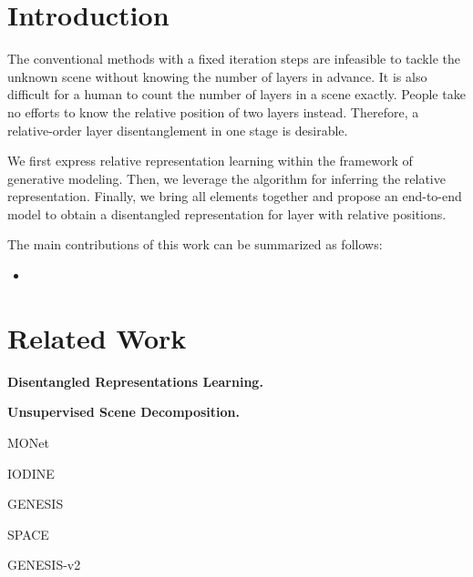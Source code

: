 \section{Introduction}


\noindent \red{[background]}




\noindent {}

The conventional methods with a fixed iteration steps are infeasible to tackle the unknown scene without knowing the number of layers in advance.
It is also difficult for a human to count the number of layers in a scene exactly.
People take no efforts to know the relative position of two layers instead.
Therefore, a relative-order layer disentanglement in one stage is desirable.

\noindent {}

We first express relative representation learning within the framework of generative modeling.
Then, we leverage the algorithm for inferring the relative representation.
Finally, we bring all elements together and propose an end-to-end model to obtain a disentangled representation for layer with relative positions.



\noindent {}





The main contributions of this work can be summarized as follows:
\begin{itemize}
    \item 
\end{itemize}

\section{Related Work}

\noindent \textbf{Disentangled Representations Learning.}


\noindent \textbf{Unsupervised Scene Decomposition.}


MONet

IODINE

GENESIS

SPACE

GENESIS-v2




